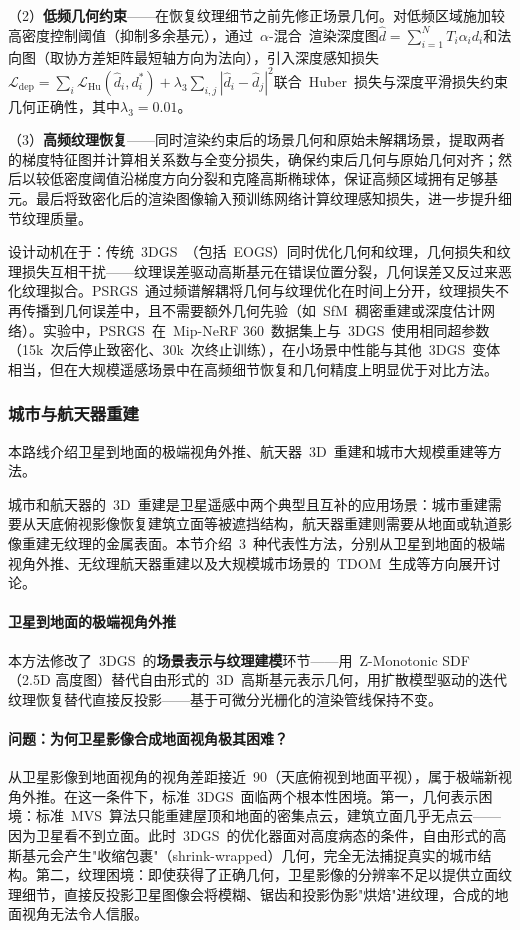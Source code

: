 （2）\textbf{低频几何约束}——在恢复纹理细节之前先修正场景几何。对低频区域施加较高密度控制阈值（抑制多余基元），通过~$\alpha$-混合~渲染深度图$\hat{d} = \sum_{i=1}^{N}T_i\alpha_i d_i$和法向图（取协方差矩阵最短轴方向为法向），引入深度感知损失$\mathcal{L}_{\text{dep}} = \sum_i \mathcal{L}_{\text{Hu}}(\hat{d}_i, d_i^{*}) + \lambda_3\sum_{i,j}|\hat{d}_i - \hat{d}_j|^2$联合~Huber~损失与深度平滑损失约束几何正确性，其中$\lambda_3 = 0.01$。

（3）\textbf{高频纹理恢复}——同时渲染约束后的场景几何和原始未解耦场景，提取两者的梯度特征图并计算相关系数与全变分损失，确保约束后几何与原始几何对齐；然后以较低密度阈值沿梯度方向分裂和克隆高斯椭球体，保证高频区域拥有足够基元。最后将致密化后的渲染图像输入预训练网络计算纹理感知损失，进一步提升细节纹理质量。

设计动机在于：传统~3DGS~（包括~EOGS）同时优化几何和纹理，几何损失和纹理损失互相干扰——纹理误差驱动高斯基元在错误位置分裂，几何误差又反过来恶化纹理拟合。PSRGS~通过频谱解耦将几何与纹理优化在时间上分开，纹理损失不再传播到几何误差中，且不需要额外几何先验（如~SfM~稠密重建或深度估计网络）。实验中，PSRGS~在~Mip-NeRF 360~数据集上与~3DGS~使用相同超参数（15k~次后停止致密化、30k~次终止训练），在小场景中性能与其他~3DGS~变体相当，但在大规模遥感场景中在高频细节恢复和几何精度上明显优于对比方法。

\subsubsection{城市与航天器重建}

本路线介绍卫星到地面的极端视角外推、航天器~3D~重建和城市大规模重建等方法。

城市和航天器的~3D~重建是卫星遥感中两个典型且互补的应用场景：城市重建需要从天底俯视影像恢复建筑立面等被遮挡结构，航天器重建则需要从地面或轨道影像重建无纹理的金属表面。本节介绍~3~种代表性方法，分别从卫星到地面的极端视角外推、无纹理航天器重建以及大规模城市场景的~TDOM~生成等方向展开讨论。

\paragraph{卫星到地面的极端视角外推}
本方法修改了~3DGS~的\textbf{场景表示与纹理建模}环节——用~Z-Monotonic SDF（2.5D 高度图）替代自由形式的~3D~高斯基元表示几何，用扩散模型驱动的迭代纹理恢复替代直接反投影——基于可微分光栅化的渲染管线保持不变。

\paragraph{问题：为何卫星影像合成地面视角极其困难？}
从卫星影像到地面视角的视角差距接近~90\textdegree{}（天底俯视到地面平视），属于极端新视角外推。在这一条件下，标准~3DGS~面临两个根本性困境。第一，几何表示困境：标准~MVS~算法只能重建屋顶和地面的密集点云，建筑立面几乎无点云——因为卫星看不到立面。此时~3DGS~的优化器面对高度病态的条件，自由形式的高斯基元会产生"收缩包裹"（shrink-wrapped）几何，完全无法捕捉真实的城市结构。第二，纹理困境：即使获得了正确几何，卫星影像的分辨率不足以提供立面纹理细节，直接反投影卫星图像会将模糊、锯齿和投影伪影"烘焙"进纹理，合成的地面视角无法令人信服。

